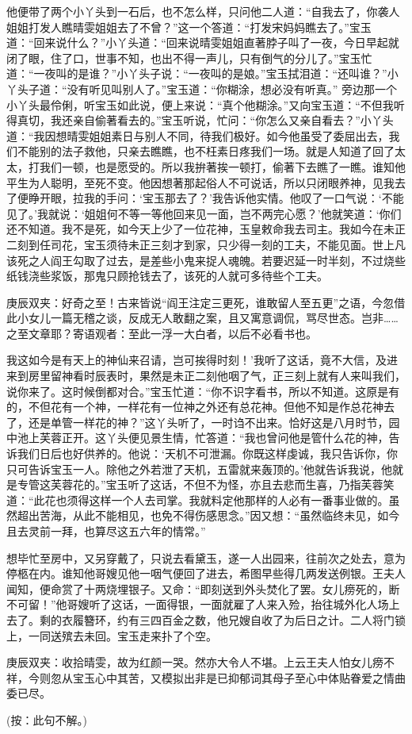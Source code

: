 \begin{parag}
    他便带了两个小丫头到一石后，也不怎么样，只问他二人道：“自我去了，你袭人姐姐打发人瞧晴雯姐姐去了不曾？”这一个答道：“打发宋妈妈瞧去了。”宝玉道：“回来说什么？”小丫头道：“回来说晴雯姐姐直著脖子叫了一夜，今日早起就闭了眼，住了口，世事不知，也出不得一声儿，只有倒气的分儿了。”宝玉忙道：“一夜叫的是谁？”小丫头子说：“一夜叫的是娘。”宝玉拭泪道：“还叫谁？”小丫头子道：“没有听见叫别人了。”宝玉道：“你糊涂，想必没有听真。” 旁边那一个小丫头最伶俐，听宝玉如此说，便上来说：“真个他糊涂。”又向宝玉道：“不但我听得真切，我还亲自偷著看去的。”宝玉听说，忙问：“你怎么又亲自看去？”小丫头道：“我因想晴雯姐姐素日与别人不同，待我们极好。如今他虽受了委屈出去，我们不能别的法子救他，只亲去瞧瞧，也不枉素日疼我们一场。就是人知道了回了太太，打我们一顿，也是愿受的。所以我拚著挨一顿打，偷著下去瞧了一瞧。谁知他平生为人聪明，至死不变。他因想著那起俗人不可说话，所以只闭眼养神，见我去了便睁开眼，拉我的手问：‘宝玉那去了？’我告诉他实情。他叹了一口气说：‘不能见了。’我就说：‘姐姐何不等一等他回来见一面，岂不两完心愿？’他就笑道：‘你们还不知道。我不是死，如今天上少了一位花神，玉皇敕命我去司主。我如今在未正二刻到任司花，宝玉须待未正三刻才到家，只少得一刻的工夫，不能见面。世上凡该死之人阎王勾取了过去，是差些小鬼来捉人魂魄。若要迟延一时半刻，不过烧些纸钱浇些浆饭，那鬼只顾抢钱去了，该死的人就可多待些个工夫。\begin{note}庚辰双夹：好奇之至！古来皆说“阎王注定三更死，谁敢留人至五更”之语，今忽借此小女儿一篇无稽之谈，反成无人敢翻之案，且又寓意调侃，骂尽世态。岂非……之至文章耶？寄语观者：至此一浮一大白者，以后不必看书也。\end{note}我这如今是有天上的神仙来召请，岂可挨得时刻！’我听了这话，竟不大信，及进来到房里留神看时辰表时，果然是未正二刻他咽了气，正三刻上就有人来叫我们，说你来了。这时候倒都对合。”宝玉忙道：“你不识字看书，所以不知道。这原是有的，不但花有一个神，一样花有一位神之外还有总花神。但他不知是作总花神去了，还是单管一样花的神？”这丫头听了，一时诌不出来。恰好这是八月时节，园中池上芙蓉正开。这丫头便见景生情，忙答道：“我也曾问他是管什么花的神，告诉我们日后也好供养的。他说：‘天机不可泄漏。你既这样虔诚，我只告诉你，你只可告诉宝玉一人。除他之外若泄了天机，五雷就来轰顶的。’他就告诉我说，他就是专管这芙蓉花的。”宝玉听了这话，不但不为怪，亦且去悲而生喜，乃指芙蓉笑道：“此花也须得这样一个人去司掌。我就料定他那样的人必有一番事业做的。虽然超出苦海，从此不能相见，也免不得伤感思念。”因又想：“虽然临终未见，如今且去灵前一拜，也算尽这五六年的情常。”
\end{parag}


\begin{parag}
    想毕忙至房中，又另穿戴了，只说去看黛玉，遂一人出园来，往前次之处去，意为停柩在内。谁知他哥嫂见他一咽气便回了进去，希图早些得几两发送例银。王夫人闻知，便命赏了十两烧埋银子。又命：“即刻送到外头焚化了罢。女儿痨死的，断不可留！”他哥嫂听了这话，一面得银，一面就雇了人来入殓，抬往城外化人场上去了。剩的衣履簪环，约有三四百金之数，他兄嫂自收了为后日之计。二人将门锁上，一同送殡去未回。宝玉走来扑了个空。\begin{note}庚辰双夹：收拾晴雯，故为红颜一哭。然亦大令人不堪。上云王夫人怕女儿痨不祥，今则忽从宝玉心中其苦，又模拟出非是已抑郁词其母子至心中体贴眷爱之情曲委已尽。\end{note}(按：此句不解。)
\end{parag}


